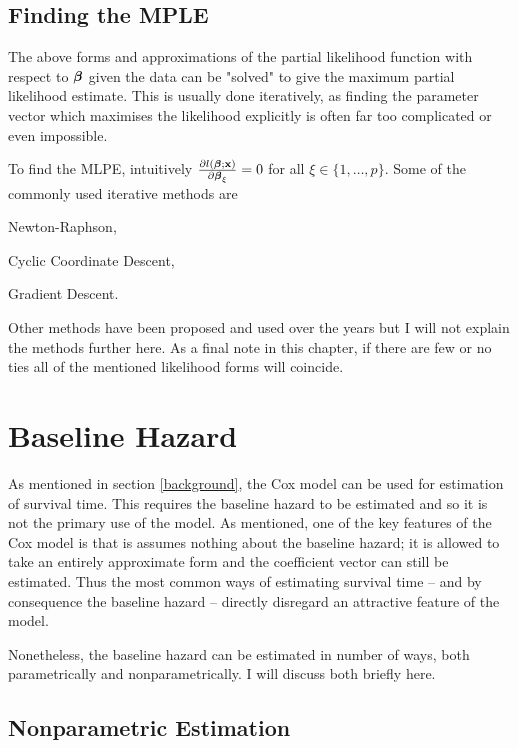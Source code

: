 \subsection{Finding the MPLE}

The above forms and approximations of the partial likelihood function with respect to $\boldsymbol{\beta}$ given the data can be "solved" to give the maximum partial likelihood estimate. This is usually done iteratively, as finding the parameter vector which maximises the likelihood explicitly is often far too complicated or even impossible. 

To find the MLPE, intuitively $\pdv{l(\boldsymbol{\beta};\textbf{x})}{\boldsymbol{\beta}_\xi}=0$ for all $\xi\in\{1,\ldots,p\}$. Some of the commonly used iterative methods are

\begin{itemize}
\begin{spacing}{0}
    \item Newton-Raphson,
    \item Cyclic Coordinate Descent,
    \item Gradient Descent.
\end{spacing}
\end{itemize}

Other methods have been proposed and used over the years but I will not explain the methods further here. 
As a final note in this chapter, if there are few or no ties all of the mentioned likelihood forms will coincide.

\section{Baseline Hazard}\label{baseline}

As mentioned in section \ref{background}, the Cox model can be used for estimation of survival time. This requires the baseline hazard to be estimated and so it is not the primary use of the model. As mentioned, one of the key features of the Cox model is that is assumes nothing about the baseline hazard; it is allowed to take an entirely approximate form and the coefficient vector can still be estimated. Thus the most common ways of estimating survival time -- and by consequence the baseline hazard -- directly disregard an attractive feature of the model.

Nonetheless, the baseline hazard can be estimated in number of ways, both parametrically and nonparametrically. I will discuss both briefly here. 

\subsection{Nonparametric Estimation}

